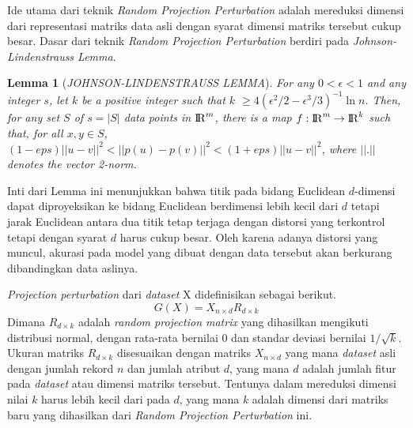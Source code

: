 Ide utama dari teknik \textit{Random Projection Perturbation} adalah mereduksi dimensi dari representasi matriks data asli dengan syarat dimensi matriks tersebut cukup besar. Dasar dari teknik \textit{Random Projection Perturbation} berdiri pada \textit{Johnson-Lindenstrauss Lemma}.~\cite{lindestrauss:84:jllemma}
\newtheorem{theorem}{Lemma}
\begin{theorem}[\textit{JOHNSON-LINDENSTRAUSS LEMMA}]
	For any \(0 < \epsilon < 1\) and any integer \(s\), let \(k\) be a positive integer such that \(k\) \(\geq 4(\epsilon^{2}/2-\epsilon^{3}/3)^{-1}\ln{n}\). Then, for any set \(S\) of \(s = |S|\) data points in \({\rm I\!R}^{m}\), there is a map \(f : {\rm I\!R}^{m} \rightarrow {\rm I\!R}^{k}\) such that, for all \(x, y \in S\), \((1-eps)||u - v||^{2}<||p(u) - p(v)||^{2}<(1+eps)||u - v||^{2}\), where \(||.||\) denotes the vector 2-norm.
\end{theorem}
Inti dari Lemma ini menunjukkan bahwa titik pada bidang Euclidean \(d\)-dimensi dapat diproyeksikan ke bidang Euclidean berdimensi lebih kecil dari \(d\) tetapi jarak Euclidean antara dua titik tetap terjaga dengan distorsi yang terkontrol tetapi dengan syarat \(d\) harus cukup besar. Oleh karena adanya distorsi yang muncul, akurasi pada model yang dibuat dengan data tersebut akan berkurang dibandingkan data aslinya.~\cite{kargupta:06:projection}

\textit{Projection perturbation} dari \textit{dataset} X didefinisikan sebagai berikut.
\begin{equation}
	G(X) = X_{n \times d} R_{d \times k}
\end{equation}
Dimana \(R_{d \times k}\) adalah \textit{random projection matrix} yang dihasilkan mengikuti distribusi normal, dengan rata-rata bernilai 0 dan standar deviasi bernilai \(1/\sqrt{k}\). Ukuran matriks \(R_{d \times k}\) disesuaikan dengan matriks \(X_{n \times d}\) yang mana \textit{dataset} asli dengan jumlah rekord \(n\) dan jumlah atribut \(d\), yang mana \(d\) adalah jumlah fitur pada \textit{dataset} atau dimensi matriks tersebut. Tentunya dalam mereduksi dimensi nilai \(k\) harus lebih kecil dari pada \(d\), yang mana \(k\) adalah dimensi dari matriks baru yang dihasilkan dari \textit{Random Projection Perturbation} ini.

